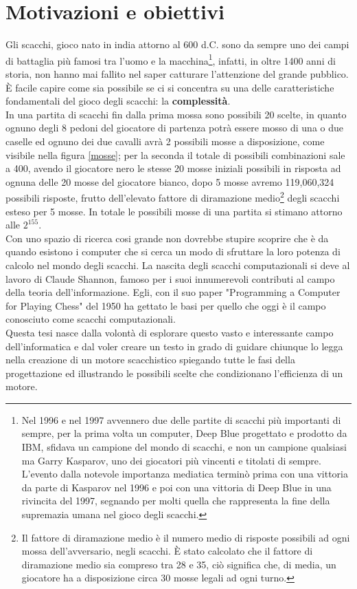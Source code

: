 \section{Motivazioni e obiettivi}
Gli scacchi, gioco nato in india attorno al 600 d.C.\cite{beginning} sono da sempre uno dei campi di battaglia più famosi tra l'uomo e la macchina\footnote{Nel 1996 e nel 1997 avvennero due delle partite di scacchi più importanti di sempre,
 per la prima volta un computer, Deep Blue progettato e prodotto da IBM, sfidava un campione del mondo di scacchi, e non un campione qualsiasi ma Garry Kasparov, uno dei giocatori più vincenti e titolati di sempre. 
 L'evento dalla notevole importanza mediatica terminò prima con una vittoria da parte di Kasparov nel 1996 e poi con una vittoria di Deep Blue in una rivincita del 1997, segnando per molti quella che rappresenta la
  fine della supremazia umana nel gioco degli scacchi. }, infatti, in oltre 1400 anni di storia, non hanno mai fallito nel saper catturare l'attenzione del grande pubblico.
 \\È facile capire come sia possibile se ci si concentra su una delle caratteristiche fondamentali del 
 gioco degli scacchi: la \textbf{complessità}.\\In una partita di scacchi fin dalla prima mossa 
sono possibili 20 scelte, in quanto ognuno degli 8 pedoni del giocatore di partenza potrà essere mosso di una o due caselle ed ognuno dei due cavalli avrà 2 possibili mosse a disposizione, come visibile nella figura \ref{mosse}; per la seconda il totale di possibili combinazioni sale a 400, avendo il giocatore nero le stesse 20 mosse iniziali possibili in risposta ad ognuna delle 20 mosse del giocatore bianco,
 dopo 5 mosse avremo 119,060,324 possibili risposte, frutto dell'elevato fattore di diramazione medio\footnote{ Il fattore di diramazione medio è il numero medio di risposte possibili ad ogni mossa dell'avversario, negli scacchi. È stato calcolato che il fattore di diramazione medio sia compreso tra 28 e 35, ciò significa che, di media, un giocatore ha a disposizione circa 30 mosse legali ad ogni turno.} degli scacchi esteso per 5 mosse. In totale le possibili mosse di una partita si stimano attorno alle \(2^{155} \).
 \\Con uno spazio di ricerca cosi grande non dovrebbe stupire scoprire che è da quando esistono i computer che si cerca un modo
 di sfruttare la loro potenza di calcolo nel mondo degli scacchi.
 La nascita degli scacchi computazionali si deve al lavoro di Claude Shannon, famoso per i suoi innumerevoli contributi al 
 campo della teoria dell'informazione. Egli, con il suo paper "Programming a Computer for Playing Chess"\cite{shannon} del 1950 ha gettato le
 basi per quello che oggi è il campo conosciuto come scacchi computazionali.
 \\Questa tesi nasce dalla volontà di esplorare questo vasto e interessante campo dell'informatica e dal voler creare un testo
 in grado di guidare chiunque lo legga nella creazione di un motore scacchistico spiegando tutte le fasi della progettazione
 ed illustrando le possibili scelte che condizionano l'efficienza di un motore.


